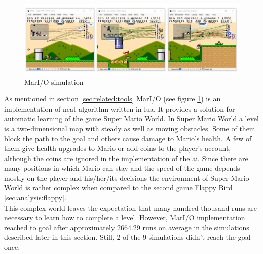 		\begin{figure}[h]
			\centering
			\includegraphics[width=1\textwidth]{graphics/mario/mario3}
			\caption{MarI/O simulation}
			\label{fig:mario}
		\end{figure}
		As mentioned in section \ref{sec:related:tools} MarI/O (see figure \ref{fig:mario}) is an implementation of \gls{neat}-algorithm written in \gls{lua}. It provides a solution for automatic learning of the game Super Mario World. In Super Mario World a level is a two-dimensional map with steady as well as moving obstacles.
		Some of them block the path to the goal and others cause damage to Mario's health. A few of them give health upgrades to Mario or add coins to the player's account, although the coins are ignored in the implementation of the \gls{ai}. Since there are many positions in which Mario can stay and the speed of the game depends mostly on the player and his/her/its decisions the environment of Super Mario World is rather complex when compared to the second game Flappy Bird \ref{sec:analysis:flappy}.\\
		This complex world leaves the expectation that many hundred thousand runs are necessary to learn how to complete a level. However, MarI/O implementation reached to goal after approximately $2664.29$ runs on average in the simulations described later in this section. Still, 2 of the 9 simulations didn't reach the goal once.\\
		 \\
